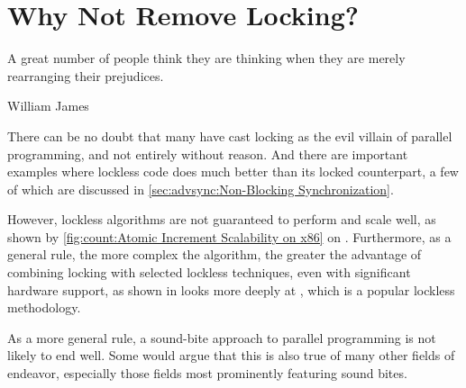 
\section{Why Not Remove Locking?}
\label{sec:app:questions:Why Not Remove Locking?}
%
\epigraph{A great number of people think they are thinking when they
	  are merely rearranging their prejudices.}
	 {William James}

There can be no doubt that many have cast locking as the evil villain
of parallel programming, and not entirely without reason.
And there are important examples where lockless code does much better
than its locked counterpart, a few of which are discussed in
\cref{sec:advsync:Non-Blocking Synchronization}.

However, lockless algorithms are not guaranteed to perform and scale
well, as shown by
\cref{fig:count:Atomic Increment Scalability on x86} on
.
Furthermore, as a general rule, the more complex the algorithm,
the greater the advantage of combining locking with selected
lockless techniques, even with significant hardware support,
as shown in
looks more deeply at , which is a popular
lockless methodology.

As a more general rule, a sound-bite approach to parallel programming
is not likely to end well.
Some would argue that this is also true of many other fields of endeavor,
especially those fields most prominently featuring sound bites.
